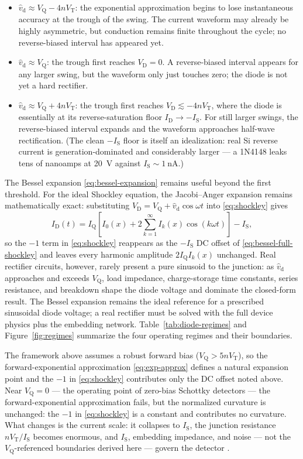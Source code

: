 \documentclass[12pt]{article}
\newcommand{\ID}{I_{\mathrm{D}}}
\newcommand{\VD}{V_{\mathrm{D}}}
\newcommand{\IS}{I_{\mathrm{S}}}
\newcommand{\VT}{V_{\mathrm{T}}}
\newcommand{\VQ}{V_{\mathrm{Q}}}
\newcommand{\IQ}{I_{\mathrm{Q}}}
\newcommand{\vhd}{\hat{v}_{\mathrm{d}}}
\begin{document}
\begin{itemize}
    \item $\vhd \approx \VQ - 4n\VT$: the exponential approximation begins to lose instantaneous accuracy at the trough of the swing. The current waveform may already be highly asymmetric, but conduction remains finite throughout the cycle; no reverse-biased interval has appeared yet.
    \item $\vhd \approx \VQ$: the trough first reaches $\VD = 0$. A reverse-biased interval appears for any larger swing, but the waveform only just touches zero; the diode is not yet a hard rectifier.
    \item $\vhd \approx \VQ + 4n\VT$: the trough first reaches $\VD \lesssim -4n\VT$, where the diode is essentially at its reverse-saturation floor $\ID \to -\IS$. For still larger swings, the reverse-biased interval expands and the waveform approaches half-wave rectification. (The clean $-\IS$ floor is itself an idealization: real Si reverse current is generation-dominated and considerably larger --- a 1N4148 leaks tens of nanoamps at \SI{20}{\volt} against $\IS \sim \SI{1}{\nano\ampere}$.)
\end{itemize}

The Bessel expansion \eqref{eq:bessel-expansion} remains useful beyond the first threshold. For the ideal Shockley equation, the Jacobi--Anger expansion remains mathematically exact: substituting $\VD = \VQ + \vhd\cos\omega t$ into \eqref{eq:shockley} gives
\begin{equation}
\ID(t) = \IQ\left[I_0(x) + 2\sum_{k=1}^\infty I_k(x)\cos(k\omega t)\right] - \IS,
\label{eq:bessel-full-shockley}
\end{equation}
so the $-1$ term in \eqref{eq:shockley} reappears as the $-\IS$ DC offset of \eqref{eq:bessel-full-shockley} and leaves every harmonic amplitude $2\IQ I_k(x)$ unchanged. Real rectifier circuits, however, rarely present a pure sinusoid to the junction: as $\vhd$ approaches and exceeds $\VQ$, load impedance, charge-storage time constants, series resistance, and breakdown shape the diode voltage and dominate the closed-form result. The Bessel expansion remains the ideal reference for a prescribed sinusoidal diode voltage; a real rectifier must be solved with the full device physics plus the embedding network. Table~\ref{tab:diode-regimes} and Figure~\ref{fig:regimes} summarize the four operating regimes and their boundaries.

The framework above assumes a robust forward bias ($\VQ > 5n\VT$), so the forward-exponential approximation \eqref{eq:exp-approx} defines a natural expansion point and the $-1$ in \eqref{eq:shockley} contributes only the DC offset noted above. Near $\VQ = 0$ --- the operating point of zero-bias Schottky detectors --- the forward-exponential approximation fails, but the normalized curvature is unchanged: the $-1$ in \eqref{eq:shockley} is a constant and contributes no curvature. What changes is the current scale: it collapses to $\IS$, the junction resistance $n\VT/\IS$ becomes enormous, and $\IS$, embedding impedance, and noise --- not the $\VQ$-referenced boundaries derived here --- govern the detector \cite{cowley}.
\end{document}
